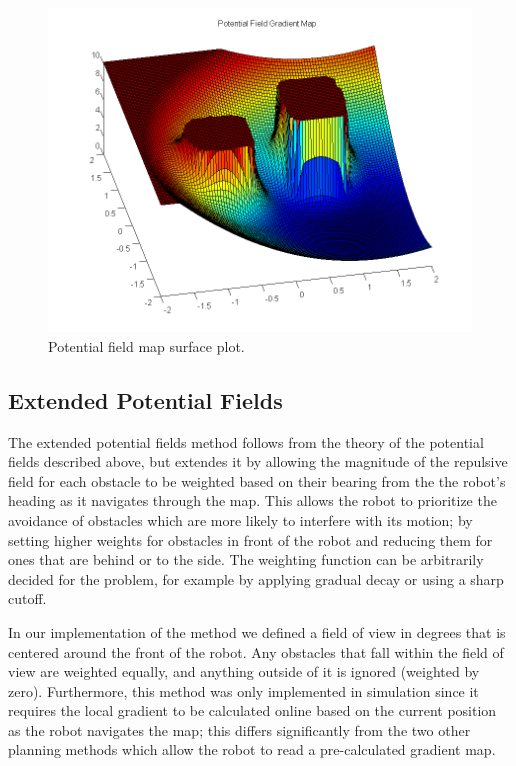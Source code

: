 \documentclass[11pt]{article} %
\begin{document}
\begin{figure}[hbt]
 \centering
 \includegraphics[scale=0.60]{Potential_Field_Surf_Plot.png}
 \caption{Potential field map surface plot.}
 \label{potField_Surf}
\end{figure}


\subsection{Extended Potential Fields}
The extended potential fields method follows from the theory of the potential fields described above, but extendes it by allowing the magnitude of the repulsive field for each obstacle to be weighted based on their bearing from the the robot's heading as it navigates through the map. This allows the robot to prioritize the avoidance of obstacles which are more likely to interfere with its motion; by setting higher weights for obstacles in front of the robot and reducing them for ones that are behind or to the side. The weighting function can be arbitrarily decided for the problem, for example by applying gradual decay or using a sharp cutoff.

In our implementation of the method we defined a field of view in degrees that is centered around the front of the robot. Any obstacles that fall within the field of view are weighted equally, and anything outside of it is ignored (weighted by zero). Furthermore, this method was only implemented in simulation since it requires the local gradient to be calculated online based on the current position as the robot navigates the map; this differs significantly from the two other planning methods which allow the robot to read a pre-calculated gradient map.
\end{document}
